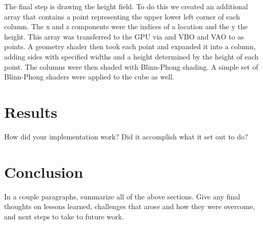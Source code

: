 \documentclass[12pt,titlepage]{article}
\begin{document}
The final step is drawing the height field.  To do this we created an additional array that contains a point representing the upper lower left corner of each column.  The x and z components were the indices of a location and the y the height.  This array was transferred to the GPU via and VBO and VAO to as points.  A geometry shader then took each point and expanded it into a column, adding sides with specified widths and a height determined by the height of each point.  The columns were then shaded with Blinn-Phong shading.  A simple set of Blinn-Phong shaders were applied to the cube as well.

\section{Results}

How did your implementation work? Did it accomplish what it set out to do?

\section{Conclusion}

In a couple paragraphs, summarize all of the above sections. Give any final thoughts on lessons learned, challenges that arose and how they were overcome, and next steps to take to future work.

\nocite{*}
\printbibliography
\end{document}

